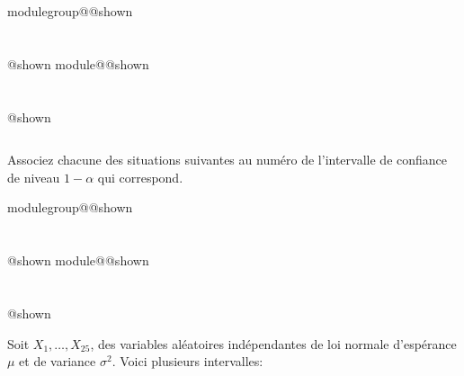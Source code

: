 \documentclass{Evaluation}
\makeatletter
\newcommand{\currentmodulekey}{}
\newcommand{\currentmoduletitle}{}
\newcommand{\currentgroupkey}{}
\newcommand{\currentgrouptitle}{}
\newcommand{\showmoduleifneeded}{%
  \ifx\currentgroupkey\empty\else
    \expandafter\ifx\csname modulegroup@\currentgroupkey @shown\endcsname\relax
      \section*{\currentgrouptitle}%
      \expandafter\gdef\csname modulegroup@\currentgroupkey @shown\endcsname{1}%
    \fi
  \fi
  \expandafter\ifx\csname module@\currentmodulekey @shown\endcsname\relax
    \section*{\currentmoduletitle}%
    \expandafter\gdef\csname module@\currentmodulekey @shown\endcsname{1}%
  \fi
}
\newenvironment{A23}{\showmoduleifneeded}{}
\newenvironment{H24}{\showmoduleifneeded}{}
\makeatother
\begin{document}
\begin{questions}
\begin{A23}
\begin{center}
\begin{tabular}{|c|c|c|c|c|}
\end{tabular}

\end{center}

Associez chacune des situations suivantes au numéro de l'intervalle de confiance de niveau $1-\alpha$ qui correspond.

\end{A23}

\begin{H24}
\question {} %
Soit $X_1,\hdots, X_{25}$, des variables aléatoires indépendantes de loi normale d'espérance $\mu$ et de variance $\sigma^2$. Voici plusieurs intervalles:
\begin{center}


\end{center}
\end{H24}
\end{questions}
\end{document}
